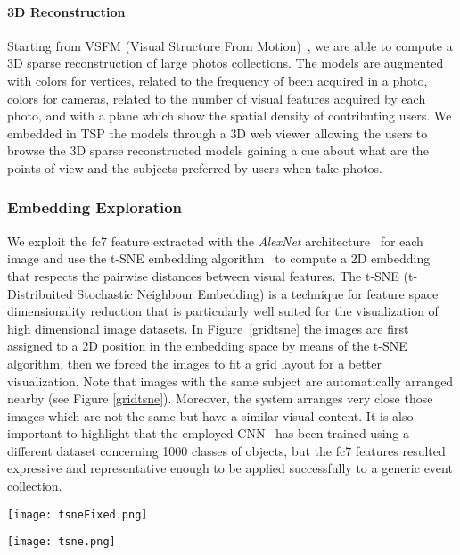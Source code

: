 \paragraph{3D Reconstruction}
Starting from VSFM (Visual Structure From Motion)~\cite{wu2013towards}, we are able to compute a 3D sparse reconstruction of large photos collections. The models are augmented with colors for vertices, related to the frequency of been acquired in a photo, colors for cameras, related to the number of visual features acquired by each photo, and with a plane which show the spatial density of contributing users. We embedded in TSP the models through a 3D web viewer allowing the users to browse the 3D sparse reconstructed models gaining a cue about what are the points of view and the subjects preferred by users when take photos. %
\vspace{-0.2cm}



\subsubsection{Embedding Exploration}
We exploit the fc7 feature extracted with the \textit{AlexNet} architecture~\cite{krizhevsky2012imagenet} for each image and use the t-SNE embedding algorithm~\cite{van2008visualizing} to compute a 2D embedding that respects the pairwise distances between visual features.
The t-SNE (t-Distribuited Stochastic Neighbour Embedding) is a technique for feature space dimensionality reduction that is particularly well suited for the visualization of high dimensional image datasets.
In Figure~\ref{gridtsne} the images are first assigned to a 2D position in the embedding space by means of the t-SNE algorithm, then we forced the images to fit a grid layout for a better visualization. Note that images with the same subject are automatically arranged nearby (see Figure \ref{gridtsne}). Moreover, the system arranges very close those images which are not the same but have a similar visual content. It is also important to highlight that the employed CNN~\cite{krizhevsky2012imagenet} has been trained using a different dataset concerning 1000 classes of objects, but the fc7 features resulted expressive and representative enough to be applied successfully to a generic event collection.
\begin{figure*}
	\centering
	\texttt{[image: tsneFixed.png]}
	\caption{t-SNE visualization, the images are forced to fit a grid layout. Images of an event are automatically organized by visual content. Images close in the 2D space of the visualization tool are also close in terms of visual content.}
	\label{gridtsne}
\end{figure*}
\begin{figure*}
	\centering
	\texttt{[image: tsne.png]}
	\caption{photos embedding based on the t-SNE coordinates.}
	\label{tsne}
\end{figure*}

